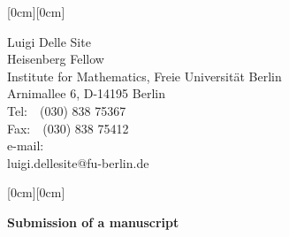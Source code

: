 \documentclass[12pt]{article}
\newcommand{\kopf}{\noindent
\raisebox{2.5cm}[0cm][0cm]
{
\parbox[c]{0.88\textwidth}
{
\begin{center}
\textsc{Luigi Delle Site, Heisenberg Fellow}
\end{center}
}
}
\raisebox{2cm}[0cm][0cm]{\rule{\textwidth}{0.2mm}}}
\begin{document}

\hfill\raisebox{1.5cm}[0cm][0cm]
{\parbox[t]{0.34\textwidth}
{Luigi Delle Site\\
Heisenberg Fellow\\
Institute for Mathematics, Freie Universit\"{a}t Berlin\\
Arnimallee 6, D-14195 Berlin\\
Tel:\ \ (030) 838 75367\\
Fax:\ \ (030) 838 75412\\
{\small e-mail:\\luigi.dellesite@fu-berlin.de}
}}

\noindent\raisebox{1.05cm}[0cm][0cm]
{}

\vspace{3cm}

\textbf{Submission of a manuscript}
\end{document}
